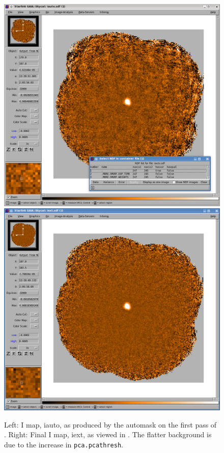 \begin{figure}[t!]
\begin{center}
\includegraphics[width=0.46\linewidth]{sc22-gaia-view-iauto.png}
\includegraphics[width=0.46\linewidth]{sc22-gaia-view-iext.png}
\label{fig:gaia-iext}
\caption [Final I map in GAIA]{
  \small Left: I map, iauto, as produced by the automask on the first pass
         of . Right: Final I map, iext, as viewed in \GAIA.
         The flatter background is due to the increase in \texttt{pca.pcathresh}.
}
\end{center}
\end{figure}


